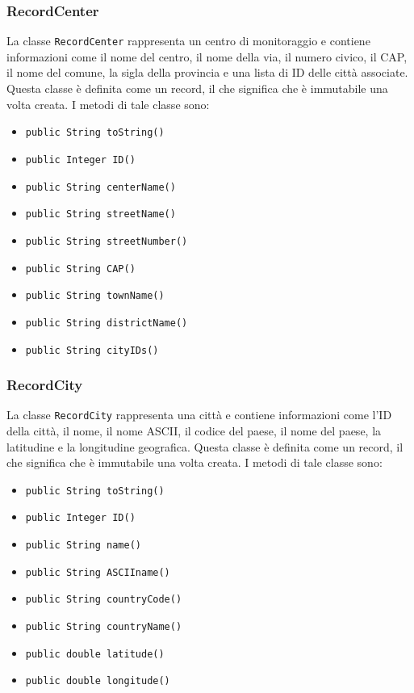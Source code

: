 \subsubsection{RecordCenter}
La classe \texttt{RecordCenter} rappresenta un centro di monitoraggio e contiene informazioni come il nome del centro, il nome della via, il numero civico, il CAP, il nome del comune, la sigla della provincia e una lista di ID delle città associate.
Questa classe è definita come un record, il che significa che è immutabile una volta creata.
I metodi di tale classe sono:
\begin{itemize}
    \item \texttt{public String toString()}
    \item \texttt{public Integer ID()}
    \item \texttt{public String centerName()}
    \item \texttt{public String streetName()}
    \item \texttt{public String streetNumber()}
    \item \texttt{public String CAP()}
    \item \texttt{public String townName()}
    \item \texttt{public String districtName()}
    \item \texttt{public String cityIDs()}
\end{itemize}

\subsubsection{RecordCity}
La classe \texttt{RecordCity} rappresenta una città e contiene informazioni come l'ID della città, il nome, il nome ASCII, il codice del paese, il nome del paese, la latitudine e la longitudine geografica.
Questa classe è definita come un record, il che significa che è immutabile una volta creata.
I metodi di tale classe sono:
\begin{itemize}
    \item \texttt{public String toString()}
    \item \texttt{public Integer ID()}
    \item \texttt{public String name()}
    \item \texttt{public String ASCIIname()}
    \item \texttt{public String countryCode()}
    \item \texttt{public String countryName()}
    \item \texttt{public double latitude()}
    \item \texttt{public double longitude()}
\end{itemize}

